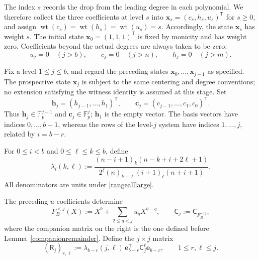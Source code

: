 \documentclass[10pt,a4paper]{amsart}
\newcommand{\F}{\mathbb{F}_p}
\newcommand{\fall}[2]{(#1)_{\underline{#2}}}
\newcommand{\rise}[2]{(#1)_{\overline{#2}}}
\begin{document}
The index $s$ records the drop from the leading degree in each
polynomial.  We therefore collect the three coefficients at level $s$ into
$\mathbf x_s=(c_s,h_s,u_s)^{\mathsf T}$ for $s\ge0$, and assign
$\operatorname{wt}(c_s)=\operatorname{wt}(h_s)=\operatorname{wt}(u_s)=s$.
Accordingly, the state $\mathbf x_s$ has weight $s$.  The initial state
$\mathbf x_0=(1,1,1)^{\mathsf T}$ is fixed by monicity and has weight zero.  Coefficients beyond the
actual degrees are always taken to be zero:
\begin{equation}\label{actual_degree_conditions}
 u_j=0\quad(j>b),\qquad
 c_j=0\quad(j>n),\qquad
 h_j=0\quad(j>m).
\end{equation}

Fix a level $1\le j\le b$, and regard the preceding states
$\mathbf x_0,\ldots,\mathbf x_{j-1}$ as specified.  The prospective
state $\mathbf x_j$ is subject to the same centering and degree
conventions; no extension satisfying the witness identity is assumed at
this stage.  Set
\begin{equation*}
 \mathbf h_j=(h_{j-1},\ldots,h_1)^{\mathsf T},\qquad
 \mathbf c_j=(c_{j-1},\ldots,c_1,c_0)^{\mathsf T}.
\end{equation*}
Thus $\mathbf h_j\in\F^{j-1}$ and $\mathbf c_j\in\F^j$;
$\mathbf h_1$ is the empty vector.  The basis vectors have indices
$0,\ldots,b-1$, whereas the rows of the level-$j$ system have indices
$1,\ldots,j$, related by $i=b-r$.

For $0\le i<b$ and $0\le\ell\le k\le b$, define
\begin{equation}\label{lambda}
 \lambda_i(k,\ell):=
 \frac{\fall{n-i+1}{k}(n-k+i+2\ell+1)}
 {2^\ell\fall n{k-\ell}\rise{i+1}{\ell}(n+i+1)}.
\end{equation}
All denominators are units under \eqref{rangealllarge}.

The preceding $u$-coefficients determine
\begin{equation*}
 F_B^{<j}(X):=X^b+\sum_{2\le q<j}u_qX^{b-q},
 \qquad
 \mathsf C_j:=\mathsf C_{F_B^{<j}},
\end{equation*}
where the companion matrix on the right is the one defined before
Lemma~\ref{companionremainder}.  Define the $j\times j$ matrix
\begin{equation*}
 (\mathsf R_j)_{r,\ell}:=
 \lambda_{b-r}(j,\ell)\,
 \mathbf e_{b-r}^{\mathsf T}\mathsf C_j^\ell \mathbf e_{b-r},
 \qquad 1\le r,\ell\le j.
\end{equation*}
\end{document}

